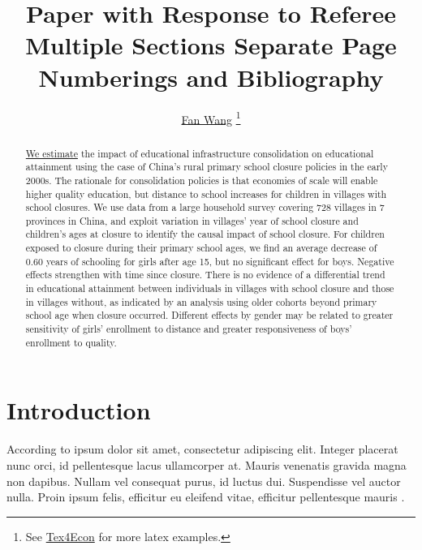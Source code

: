 \documentclass[12pt,english]{article}
\begin{document}
\title{Paper with Response to Referee\\Multiple Sections Separate Page Numberings and Bibliography}

\author{\href{http://fanwangecon.github.io/}{Fan Wang} \thanks{See \href{https://fanwangecon.github.io/Tex4Econ/}{Tex4Econ} for more latex examples.}}


\maketitle
\begin{abstract}
\singlespacing \href{https://papers.ssrn.com/sol3/papers.cfm?abstract_id=3140132}{We estimate} the impact of educational infrastructure consolidation on educational attainment using the case of China’s rural primary school closure policies in the early 2000s. The rationale for consolidation policies is that economies of scale will enable higher quality education, but distance to school increases for children in villages with school closures. We use data from a large household survey covering 728 villages in 7 provinces in China, and exploit variation in villages’ year of school closure and children’s ages at closure to identify the causal impact of school closure. For children exposed to closure during their primary school ages, we find an average decrease of 0.60 years of schooling for girls after age 15, but no significant effect for boys. Negative effects strengthen with time since closure. There is no evidence of a differential trend in educational attainment between individuals in villages with school closure and those in villages without, as indicated by an analysis using older cohorts beyond primary school age when closure occurred. Different effects by gender may be related to greater sensitivity of girls’ enrollment to distance and greater responsiveness of boys’ enrollment to quality.\end{abstract}
\vfill
\pagebreak{}

\section{Introduction}

According to ipsum dolor sit amet, consectetur adipiscing elit. Integer placerat nunc orci, id pellentesque lacus ullamcorper at. Mauris venenatis gravida magna non dapibus. Nullam vel consequat purus, id luctus dui. Suspendisse vel auctor nulla. Proin ipsum felis, efficitur eu eleifend vitae, efficitur pellentesque mauris \autocite{case_lasting_2005, conti_understanding_2010}.
\end{document}
